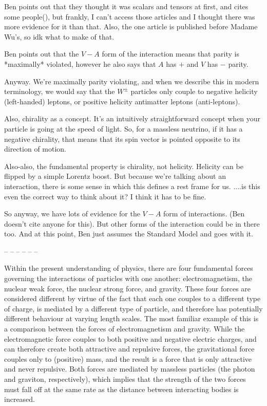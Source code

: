 Ben points out that they thought it was scalars and tensors at first, and cites some people(\cite{RustadRuby1955tensor}\cite{BurgyEpstein1957scalartensor}), but frankly, I can't access those articles and I thought there was more evidence for it than that.  Also, the one article is published before Madame Wu's, so idk what to make of that.

Ben points out that the $V-A$ form of the interaction means that parity is *maximally* violated, however he also says that $A$ has $+$ and $V$ has $-$ parity.

Anyway.  We're maximally parity violating, and when we describe this in modern terminology, we would say that the $W^{\pm}$ particles only couple to negative helicity (left-handed) leptons, or positive helicity antimatter leptons (anti-leptons).

Also, chirality as a concept.  It's an intuitively straightforward concept when your particle is going at the speed of light.  So, for a massless neutrino, if it has a negative chirality, that means that its spin vector is pointed opposite to its direction of motion.  

Also-also, the fundamental property is chirality, not helicity.  Helicity can be flipped by a simple Lorentz boost.  But because we're talking about an interaction, there is some sense in which this defines a rest frame for us.   ....is this even the correct way to think about it?  I think it has to be fine.

So anyway, we have lots of evidence for the $V-A$ form of interactions.  (Ben doesn't cite anyone for this).  But other forms of the interaction could be in there too.  And at this point, Ben just assumes the Standard Model and goes with it.

-- -- -- -- -- -- 

Within the present understanding of physics, there are four fundamental forces governing the interactions of particles with one another:  electromagnetism, the nuclear weak force, the nuclear strong force, and gravity.  These four forces are considered different by virtue of the fact that each one couples to a different type of charge, is mediated by a different type of particle, and therefore has potentially different behaviour at varying length scales.  The most familiar example of this is a comparison between the forces of electromagnetism and gravity.  While the electromagnetic force couples to both positive and negative electric charges, and can therefore create both attractive and repulsive forces, the gravitational force couples only to (positive) mass, and the result is a force that is only attractive and never repulsive.  Both forces are mediated by massless particles (the photon and graviton, respectively), which implies that the strength of the two forces must fall off at the same rate as the distance between interacting bodies is increased.

